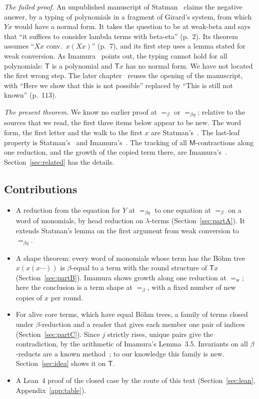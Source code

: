 \documentclass[a4paper,english]{lipics-v2021}
\newcommand{\M}{\mathsf{M}}
\newcommand{\T}{\mathsf{T}}
\newcommand{\eqw}{=_{\mathrm{w}}}
\newcommand{\eqb}{=_{\beta}}
\newcommand{\eqbe}{=_{\beta\eta}}
\begin{document}
\emph{The failed proof.} An unpublished manuscript of Statman~\cite{statman2011} claims the negative answer, by a typing of polynomials in a fragment of Girard's system, from which $Yx$ would have a normal form. It takes the question to be at weak-beta and says that ``it suffices to consider lambda terms with beta-eta'' (p.~2). Its theorem assumes ``$Xx$ conv.\ $x(Xx)$'' (p.~7), and its first step uses a lemma stated for weak conversion. As Imamura~\cite[p.~2]{imamura1} points out, the typing cannot hold for all polynomials: $\T$ is a polynomial and $\T x$ has no normal form. We have not located the first wrong step. The later chapter~\cite{statman2017} reuses the opening of the manuscript, with ``Here we show that this is not possible'' replaced by ``This is still not known'' (p.~113).

\emph{The present theorem.} We know no earlier proof at $\eqb$ or $\eqbe$; relative to the sources that we read, the first three items below appear to be new. The word form, the first letter and the walk to the first $x$ are Statman's~\cite{statman2017}. The last-leaf property is Statman's~\cite[Lemma~2]{statman1993} and Imamura's~\cite[Lemma~3.2]{imamura1}. The tracking of all $\M$-contractions along one reduction, and the growth of the copied term there, are Imamura's~\cite[Definition~2.2, Corollary~3.4]{imamura1}. Section~\ref{sec:related} has the details.

\subsection{Contributions}

\begin{itemize}
\item A reduction from the equation for $Y$ at $\eqbe$ to one equation at $\eqb$ on a word of monomials, by head reduction on $\lambda$-terms (Section~\ref{sec:partA}). It extends Statman's lemma on the first argument from weak conversion to $\eqbe$.
\item A shape theorem: every word of monomials whose term has the Böhm tree $x(x(x\cdots))$ is $\beta$-equal to a term with the round structure of $\T x$ (Section~\ref{sec:partB}). Imamura shows growth along one reduction at $\eqw$; here the conclusion is a term shape at $\eqb$, with a fixed number of new copies of $x$ per round.
\item For alive core terms, which have equal Böhm trees, a family of terms closed under $\beta$-reduction and a reader that gives each member one pair of indices (Section~\ref{sec:partC}). Since $j$ strictly rises, unique pairs give the contradiction, by the arithmetic of Imamura's Lemma~3.5. Invariants on all $\beta$-reducts are a known method~\cite[p.~2]{endrullis}; to our knowledge this family is new. Section~\ref{sec:idea} shows it on $\T$.
\item A Lean~4 proof of the closed case by the route of this text (Section~\ref{sec:lean}, Appendix~\ref{app:table}).
\end{itemize}
\end{document}

